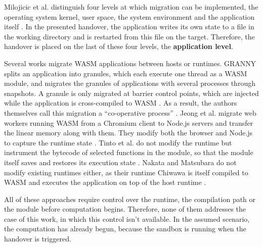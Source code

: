 Milojicic et al. distinguish four levels at which migration can be implemented, the operating system kernel, user space, the system environment and the application itself \cite{milojivcic2000process}.
In the presented handover, the application writes its own state to a file in the working directory and is restarted from this file on the target. Therefore, the handover is placed on the last of these four levels, the \textbf{application level}.

Several works migrate \ac{WASM} applications between hosts or runtimes.
GRANNY splits an application into granules, which each execute one thread as a \ac{WASM} module, and migrates the granules of applications with several processes through snapshots. A granule is only migrated at barrier control points, which are injected while the application is cross-compiled to \ac{WASM} \cite{segarra2025granny}. As a result, the authors themselves call this migration a ``co-operative process'' \cite{segarra2025granny}.
Jeong et al. migrate web workers running \ac{WASM} from a Chromium client to Node.js servers and transfer the linear memory along with them. They modify both the browser and Node.js to capture the runtime state \cite{jeong2019seamless}.
Tinto et al. do not modify the runtime but instrument the bytecode of selected functions in the module, so that the module itself saves and restores its execution state \cite{tinto2025live}.
Nakata and Matsubara do not modify existing runtimes either, as their runtime Chiwawa is itself compiled to \ac{WASM} and executes the application on top of the host runtime \cite{nakata2025self}.

All of these approaches require control over the runtime, the compilation path or the module before computation begins. Therefore, none of them addresses the case of this work, in which this control isn't available. In the assumed scenario, the computation has already begun, because the sandbox is running when the handover is triggered.

